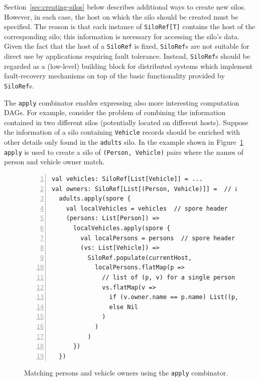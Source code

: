 \documentclass{jfp1}
\begin{document}
Section~\ref{sec:creating-silos} below describes additional ways to
create new silos. However, in each case, the host on which the silo
should be created must be specified. The reason is that each instance
of \verb|SiloRef[T]| contains the host of the corresponding silo; this
information is necessary for accessing the silo's data.  Given the
fact that the host of a \verb|SiloRef| is fixed, \verb|SiloRef|s are
not suitable for direct use by applications requiring fault
tolerance. Instead, \verb|SiloRef|s should be regarded as a
(low-level) building block for distributed systems which implement
fault-recovery mechanisms on top of the basic functionality provided
by \verb|SiloRef|s.

The \verb|apply| combinator enables expressing also more interesting
computation DAGs. For example, consider the problem of combining the
information contained in two different silos (potentially located on
different hosts). Suppose the information of a silo containing
\verb|Vehicle| records should be enriched with other details only
found in the \verb|adults| silo. In the example shown in Figure~\ref{fig:apply} \verb|apply| is
used to create a silo of \verb|(Person, Vehicle)| pairs where the
names of person and vehicle owner match.


\begin{figure}
\centering
\begin{lstlisting}[numbers=left,xleftmargin=2em,framexleftmargin=1.5em]
val vehicles: SiloRef[List[Vehicle]] = ...
val owners: SiloRef[List[(Person, Vehicle)]] =  // adults that own a vehicle
  adults.apply(spore {
    val localVehicles = vehicles  // spore header
    (persons: List[Person]) =>
      localVehicles.apply(spore {
        val localPersons = persons  // spore header
        (vs: List[Vehicle]) =>
          SiloRef.populate(currentHost,
            localPersons.flatMap(p =>
              // list of (p, v) for a single person p
              vs.flatMap(v =>
                if (v.owner.name == p.name) List((p, v))
                else Nil
              )
            )
          )
      })
  })
\end{lstlisting}
\caption{Matching persons and vehicle owners using the \texttt{apply} combinator.}\label{fig:apply}
\end{figure}
\end{document}
